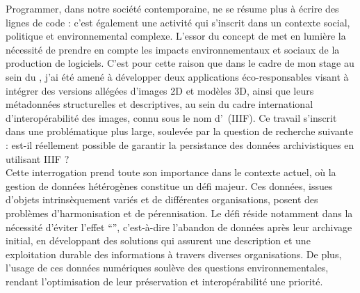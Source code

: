 
    Programmer, dans notre société contemporaine, ne se résume plus à écrire des lignes de code : c’est également une activité qui s’inscrit dans un contexte social, politique et environnemental complexe. L’essor du concept de \gco met en lumière la nécessité de prendre en compte les impacts environnementaux et sociaux de la production de logiciels. C'est pour cette raison que dans le cadre de mon stage au sein du \DSC, j'ai été amené à développer deux applications éco-responsables visant à intégrer des versions allégées d'images 2D et modèles 3D, ainsi que leurs métadonnées structurelles et descriptives, au sein du cadre international d'interopérabilité des images, connu sous le nom d'\iiif~(IIIF). Ce travail s'inscrit dans une problématique plus large, soulevée par la question de recherche suivante : est-il réellement possible de garantir la persistance des données archivistiques en utilisant IIIF ?\\

    Cette interrogation prend toute son importance dans le contexte actuel, où la gestion de données hétérogènes constitue un défi majeur. Ces données, issues d'objets intrinsèquement variés et de différentes organisations, posent des problèmes d'harmonisation et de pérennisation. Le défi réside notamment dans la nécessité d'éviter l'effet \enquote{}, c'est-à-dire l'abandon de données après leur archivage initial, en développant des solutions qui assurent une description et une exploitation durable des informations à travers diverses organisations. De plus, l'usage de ces données numériques soulève des questions environnementales, rendant l'optimisation de leur préservation et interopérabilité une priorité.\\

